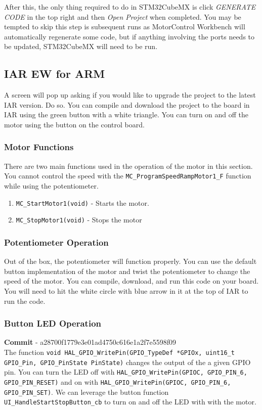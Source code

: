 \documentclass[10pt]{article}
\begin{document}
            After this, the only thing required to do in STM32CubeMX is click \emph{GENERATE CODE} in the top right and then \emph{Open Project} when completed. You may be tempted to skip this step is subsequent runs as MotorControl Workbench will automatically regenerate some code, but if anything involving the ports needs to be updated, STM32CubeMX will need to be run.
		\FloatBarrier \subsection{IAR EW for ARM}
            A screen will pop up asking if you would like to upgrade the project to the latest IAR version. Do so. You can compile and download the project to the board in IAR using the green button with a white triangle. You can turn on and off the motor using the button on the control board.
			\FloatBarrier \subsubsection{Motor Functions}
                There are two main functions used in the operation of the motor in this section. You cannot control the speed with the \texttt{MC\_ProgramSpeedRampMotor1\_F} function while using the potentiometer.
                \begin{enumerate}
                    \item \texttt{MC\_StartMotor1(void)} - Starts the motor.
                    \item \texttt{MC\_StopMotor1(void)} - Stops the motor
                \end{enumerate}
			\FloatBarrier \subsubsection{Potentiometer Operation}
            Out of the box, the potentiometer will function properly. You can use the default button implementation of the motor and twist the potentiometer to change the speed of the motor. You can compile, download, and run this code on your board. You will need to hit the white circle with blue arrow in it at the top of IAR to run the code.
			\FloatBarrier \subsubsection{Button LED Operation}
            \textbf{Commit} - a28700f1779e3e01ad4750c616e1a2f7e5598f09 \\ 
            The function \texttt{void HAL\_GPIO\_WritePin(GPIO\_TypeDef *GPIOx, uint16\_t GPIO\_Pin, GPIO\_PinState PinState)} changes the output of the a given GPIO pin. You can turn the LED off with \texttt{HAL\_GPIO\_WritePin(GPIOC, GPIO\_PIN\_6, GPIO\_PIN\_RESET)} and on with \texttt{HAL\_GPIO\_WritePin(GPIOC, GPIO\_PIN\_6, GPIO\_PIN\_SET)}. We can leverage the button function \texttt{UI\_HandleStartStopButton\_cb} to turn on and off the LED with with the motor.
\end{document}
